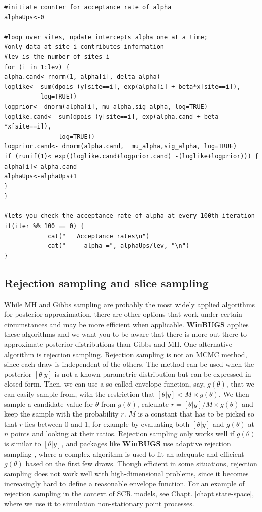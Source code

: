 {\small
\begin{verbatim}
#initiate counter for acceptance rate of alpha
alphaUps<-0

#loop over sites, update intercepts alpha one at a time;
#only data at site i contributes information
#lev is the number of sites i
for (i in 1:lev) {
alpha.cand<-rnorm(1, alpha[i], delta_alpha)
loglike<- sum(dpois (y[site==i], exp(alpha[i] + beta*x[site==i]),
		  log=TRUE))
logprior<- dnorm(alpha[i], mu_alpha,sig_alpha, log=TRUE)
loglike.cand<- sum(dpois (y[site==i], exp(alpha.cand + beta *x[site==i]),
			   log=TRUE))
logprior.cand<- dnorm(alpha.cand,  mu_alpha,sig_alpha, log=TRUE)
if (runif(1)< exp((loglike.cand+logprior.cand) -(loglike+logprior))) {
alpha[i]<-alpha.cand
alphaUps<-alphaUps+1
}
}

#lets you check the acceptance rate of alpha at every 100th iteration
if(iter %% 100 == 0) {
            cat("   Acceptance rates\n")
            cat("     alpha =", alphaUps/lev, "\n")
}
\end{verbatim}
}

\subsection{Rejection sampling and slice sampling }

While MH and Gibbs sampling are probably the most widely applied
algorithms for posterior approximation, there are other options that
work under certain circumstances and may be more efficient when
applicable. {\bf WinBUGS} applies these algorithms and we want you to be
aware that there is more out there to approximate posterior
distributions than Gibbs and MH.  One alternative algorithm is
rejection sampling. Rejection sampling is not an MCMC method, since
each draw is independent of the others. The method can be used when
the posterior $[\theta|y]$ is not a known parametric distribution but
can be expressed in closed form. Then, we can use a so-called envelope
function, say, $g(\theta)$, that we can easily sample from, with the
restriction that $[\theta|y] < M \times g(\theta)$. We then sample a
candidate value for $\theta$ from $g(\theta)$, calculate $r =
[\theta|y]/M \times g(\theta)$ and keep the sample with the probability
$r$. $M$ is a constant that has to be picked so that $r$ lies between
0 and 1, for example by evaluating both $[\theta|y]$ and $g(\theta)$
at $n$ points and looking at their ratios. Rejection sampling only
works well if $g(\theta)$ is similar to $[\theta|y]$, and packages
like {\bf WinBUGS} use adaptive rejection sampling \citep{gilks_wild:1992},
where a complex algorithm is used to fit an adequate and efficient
$g(\theta)$ based on the first few draws.
Though efficient in some
situations, rejection sampling does not work well with
high-dimensional problems, since it becomes increasingly hard to
define a reasonable envelope function. For an example of rejection
sampling in the context of SCR models, see
Chapt. \ref{chapt.state-space}, where we use it to simulation
non-stationary point processes.

